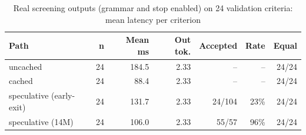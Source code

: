 \begin{table}[t]\centering\caption{Real screening outputs (grammar and stop enabled) on 24 validation criteria: mean latency per criterion}\label{tab:screening}\footnotesize
\begin{tabular}{lrrrrrr}
\hline
Path & n & Mean ms & Out tok. & Accepted & Rate & Equal\\\hline
uncached & 24 & 184.5 & 2.33 & -- & -- & 24/24\\
cached & 24 & 88.4 & 2.33 & -- & -- & 24/24\\
speculative (early-exit) & 24 & 131.7 & 2.33 & 24/104 & 23\% & 24/24\\
speculative (14M) & 24 & 106.0 & 2.33 & 55/57 & 96\% & 24/24\\
\hline\end{tabular}
\end{table}

